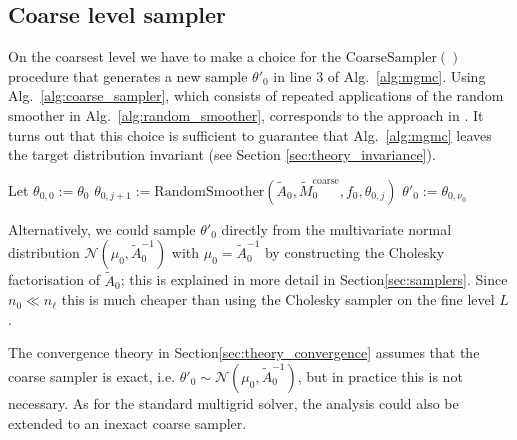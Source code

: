 \documentclass[11pt,english]{article}
\theoremstyle{plain}
\theoremstyle{plain}
\theoremstyle{plain}
\theoremstyle{plain}
\numberwithin{equation}{section}
\begin{document}
\subsection{Coarse level sampler}\label{sec:coarse_level_sampler}
On the coarsest level we have to make a choice for the $\mathrm{CoarseSampler()}$ procedure that generates a new sample $\theta'_0$ in line 3 of Alg.~\ref{alg:mgmc}. Using Alg.~\ref{alg:coarse_sampler}, which consists of repeated applications of the random smoother in Alg.~\ref{alg:random_smoother}, corresponds to the approach in \cite{goodman1989multigrid}. It turns out that this choice is sufficient to guarantee that Alg.~\ref{alg:mgmc} leaves the target distribution invariant (see Section \ref{sec:theory_invariance}).
\begin{algorithm}[t!]
    \caption{Coarse level sampler $\theta_0 \mapsto\theta'_0$\\
    Apply $\nu_0$ smoothing steps of Alg.~\ref{alg:low_rank_gibbs} with the splitting matrix $\widetilde{M}_0^{\mathrm{coarse}}$.}\label{alg:coarse_sampler}
    \begin{algorithmic}[1]
        \State  Let $\theta_{0,0}:=\theta_{0}$
        \State $\theta_{0,j+1}:=\mathrm{RandomSmoother}(\widetilde{A}_{0},\widetilde{M}_{0}^{\mathrm{coarse}},f_{0},\theta_{0,j})$
        \EndFor
        \State\Return $\theta'_0:=\theta_{0,\nu_0}$
        \EndProcedure
    \end{algorithmic}
\end{algorithm}
Alternatively, we could sample $\theta'_0$ directly from the multivariate normal distribution $\mathcal{N}(\mu_0,\widetilde{A}_0^{-1})$ with $\mu_0=\widetilde{A}_0^{-1}$ by constructing the Cholesky factorisation of $\widetilde{A}_0$; this is explained in more detail in Section\ref{sec:samplers}. Since $n_0\ll n_\ell$ this is much cheaper than using the Cholesky sampler on the fine level $L$.

The convergence theory in Section\ref{sec:theory_convergence} assumes that the coarse sampler is exact, i.e. $\theta'_0\sim\mathcal{N}(\mu_0,\widetilde{A}_0^{-1})$, but in practice this is not necessary. As for the standard multigrid solver, the analysis could also be extended to an inexact coarse sampler.
\end{document}
